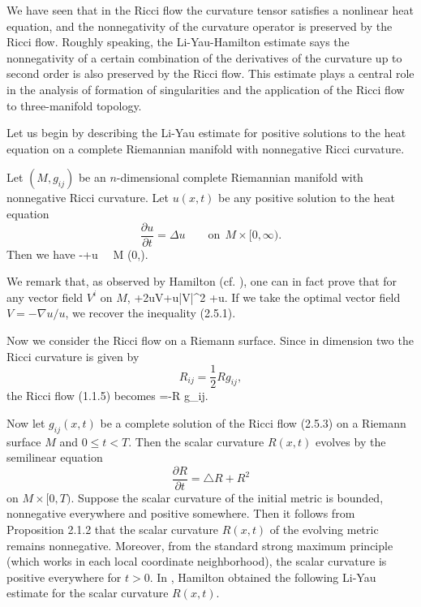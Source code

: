 We have seen that in the Ricci flow the curvature tensor satisfies
a nonlinear heat equation, and the nonnegativity of the curvature
operator is preserved by the Ricci flow. Roughly speaking, the
Li-Yau-Hamilton estimate says the nonnegativity of a certain
combination of the derivatives of the curvature up to second order
is also preserved by the Ricci flow. This estimate plays a central
role in the analysis of formation of singularities and the
application of the Ricci flow to three-manifold topology.

Let us begin by describing the Li-Yau estimate \cite{LY} for
positive solutions to the heat equation on a complete Riemannian
manifold with nonnegative Ricci curvature.

\begin{theorem}
  \label{thm:cz-liyau-differential-harnack-estimate}
Let $(M, g_{ij})$ be an $n$-dimensional complete Riemannian
manifold with nonnegative Ricci curvature. Let $u(x,t)$ be any
positive solution to the heat equation
$$
\frac{\partial u}{\partial t}=\Delta u \qquad {\text{on}} \ \
M\times [0,\infty).
$$
Then we have \be {}-+u \qquad {} \ \ M\times
(0,\infty).%
\ee
\end{theorem}

We remark that, as observed by Hamilton (cf. \cite{Ha93}), one can
in fact prove that for any vector field $V^i$ on $M$, \be
{}+2\nabla u\cdot V+u|V|^2
+u. %
\ee If we take the optimal vector field $V=-\nabla u/u$, we
recover the inequality (2.5.1).

Now we consider the Ricci flow on a Riemann surface. Since in
dimension two the Ricci curvature is given by
$$
R_{ij}=\frac{1}{2} Rg_{ij},
$$
the Ricci flow (1.1.5) becomes \be
{}=-R g_{ij}.%
\ee

Now let $g_{ij}(x,t)$ be a complete solution of the Ricci flow
(2.5.3) on a Riemann surface $M$ and $0\le t<T$. Then the scalar
curvature $ R(x,t)$ evolves by the semilinear equation
$$
\frac{\partial R}{\partial t}=\triangle R+R^{2}
$$
on $M\times[0,T)$. Suppose the scalar curvature of the initial
metric is bounded, nonnegative everywhere and positive somewhere.
Then it follows from Proposition 2.1.2 that the scalar curvature
$R(x,t)$ of the evolving metric remains nonnegative. Moreover,
from the standard strong maximum principle (which works in each
local coordinate neighborhood), the scalar curvature is positive
everywhere for $t>0$. In \cite{Ha88}, Hamilton obtained the
following Li-Yau estimate for the scalar curvature $R(x,t)$.

